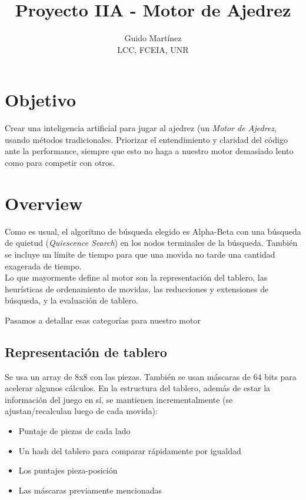 \documentclass{article}
\begin{document}
\title{Proyecto IIA - Motor de Ajedrez}

\author{Guido Martínez \\ LCC, FCEIA, UNR }

\maketitle

\section{Objetivo}

Crear una inteligencia artificial para jugar al ajedrez (un \emph {Motor
de Ajedrez}, usando métodos tradicionales. Priorizar el entendimiento
y claridad del código ante la performance, siempre que esto no haga a
nuestro motor demasiado lento como para competir con otros.

\section{Overview}

Como es usual, el algoritmo de búsqueda elegido es Alpha-Beta con una
búsqueda de quietud (\emph{Quiescence Search}) en los nodos terminales
de la búsqueda.
También se incluye un límite de tiempo para que una movida no tarde
una cantidad exagerada de tiempo.
\\

Lo que mayormente define al motor son la representación del tablero,
las heurísticas de ordenamiento de movidas, las reducciones y
extensiones de búsqueda, y la evaluación de tablero.

Pasamos a detallar esas categorías para nuestro motor
\\

\subsection{Representación de tablero}
Se usa un array de 8x8 con las piezas. También se usan máscaras
de 64 bits para acelerar algunos cálculos. En la estructura del
tablero, además de estar la información del juego en sí, se mantienen
incrementalmente (se ajustan/recalculan luego de cada movida):

\begin{itemize}
\item Puntaje de piezas de cada lado
\item Un hash del tablero para comparar rápidamente por igualdad
\item Los puntajes pieza-posición
\item Las máscaras previamente mencionadas
\end{itemize}
\end{document}
